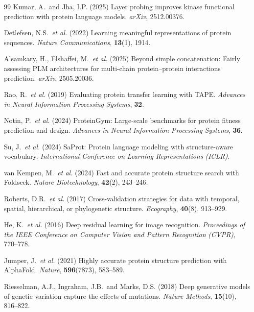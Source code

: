\documentclass[numbered,webpdf,modern,large]{oup-authoring-template}
\begin{document}
\begin{thebibliography}{99}
Kumar, A.\ and Jha, I.P. (2025)
Layer probing improves kinase functional prediction with protein language models.
\textit{arXiv}, 2512.00376.

Detlefsen, N.S.\ \textit{et al.} (2022)
Learning meaningful representations of protein sequences.
\textit{Nature Communications}, \textbf{13}(1), 1914.

Alsamkary, H., Elshaffei, M.\ \textit{et al.} (2025)
Beyond simple concatenation: Fairly assessing PLM architectures for multi-chain
protein--protein interactions prediction.
\textit{arXiv}, 2505.20036.

Rao, R.\ \textit{et al.} (2019)
Evaluating protein transfer learning with TAPE.
\textit{Advances in Neural Information Processing Systems}, \textbf{32}.

Notin, P.\ \textit{et al.} (2024)
ProteinGym: Large-scale benchmarks for protein fitness prediction and design.
\textit{Advances in Neural Information Processing Systems}, \textbf{36}.

Su, J.\ \textit{et al.} (2024)
SaProt: Protein language modeling with structure-aware vocabulary.
\textit{International Conference on Learning Representations (ICLR)}.

van Kempen, M.\ \textit{et al.} (2024)
Fast and accurate protein structure search with Foldseek.
\textit{Nature Biotechnology}, \textbf{42}(2), 243--246.

Roberts, D.R.\ \textit{et al.} (2017)
Cross-validation strategies for data with temporal, spatial, hierarchical, or
phylogenetic structure.
\textit{Ecography}, \textbf{40}(8), 913--929.

He, K.\ \textit{et al.} (2016)
Deep residual learning for image recognition.
\textit{Proceedings of the IEEE Conference on Computer Vision and Pattern Recognition (CVPR)},
770--778.

Jumper, J.\ \textit{et al.} (2021)
Highly accurate protein structure prediction with AlphaFold.
\textit{Nature}, \textbf{596}(7873), 583--589.

Riesselman, A.J., Ingraham, J.B.\ and Marks, D.S. (2018)
Deep generative models of genetic variation capture the effects of mutations.
\textit{Nature Methods}, \textbf{15}(10), 816--822.


\end{thebibliography}
\end{document}
